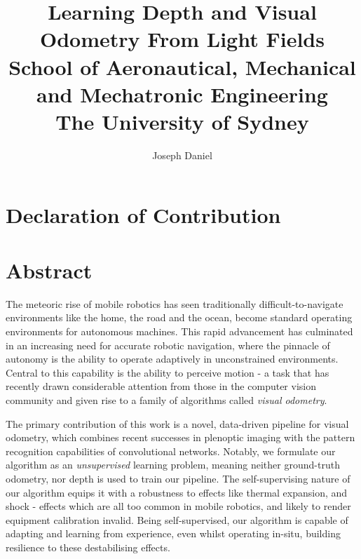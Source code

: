 \documentclass[openany]{book}
\title{Learning Depth and Visual Odometry From Light Fields \\
\large School of Aeronautical, Mechanical and Mechatronic Engineering \\
\large The University of Sydney}
\author{Joseph Daniel}
\begin{document}
\frontmatter

\maketitle

\chapter*{Declaration of Contribution}

\chapter*{Abstract}

The meteoric rise of mobile robotics has seen traditionally difficult-to-navigate environments like the home, the road and the ocean, become standard operating environments for autonomous machines. This rapid advancement has culminated in an increasing need for accurate robotic navigation, where the pinnacle of autonomy is the ability to operate adaptively in unconstrained environments. Central to this capability is the ability to perceive motion - a task that has recently drawn considerable attention from those in the computer vision community and given rise to a family of algorithms called \textit{visual odometry}. 

The primary contribution of this work is a novel, data-driven pipeline for visual odometry, which combines recent successes in plenoptic imaging with the pattern recognition capabilities of convolutional networks. Notably, we formulate our algorithm as an \textit{unsupervised} learning problem, meaning neither ground-truth odometry, nor depth is used to train our pipeline. The self-supervising nature of our algorithm equips it with a robustness to effects like thermal expansion, and shock - effects which are all too common in mobile robotics, and likely to render equipment calibration invalid. Being self-supervised, our algorithm is capable of adapting and learning from experience, even whilst operating in-situ, building resilience to these destabilising effects.

\end{document}
